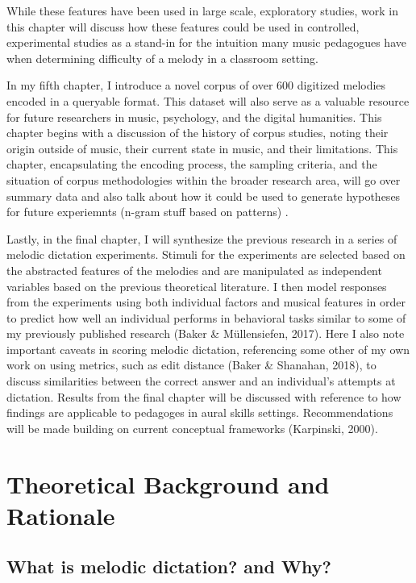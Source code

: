 \documentclass[]{book}
\theoremstyle{definition}
\theoremstyle{definition}
\theoremstyle{definition}
\theoremstyle{remark}
\begin{document}
While these features have been used in large scale, exploratory studies,
work in this chapter will discuss how these features could be used in
controlled, experimental studies as a stand-in for the intuition many
music pedagogues have when determining difficulty of a melody in a
classroom setting.

In my fifth chapter, I introduce a novel corpus of over 600 digitized
melodies encoded in a queryable format. This dataset will also serve as
a valuable resource for future researchers in music, psychology, and the
digital humanities. This chapter begins with a discussion of the history
of corpus studies, noting their origin outside of music, their current
state in music, and their limitations. This chapter, encapsulating the
encoding process, the sampling criteria, and the situation of corpus
methodologies within the broader research area, will go over summary
data and also talk about how it could be used to generate hypotheses for
future experiemnts (n-gram stuff based on patterns) .

Lastly, in the final chapter, I will synthesize the previous research in
a series of melodic dictation experiments. Stimuli for the experiments
are selected based on the abstracted features of the melodies and are
manipulated as independent variables based on the previous theoretical
literature. I then model responses from the experiments using both
individual factors and musical features in order to predict how well an
individual performs in behavioral tasks similar to some of my previously
published research (Baker \& Müllensiefen, 2017). Here I also note
important caveats in scoring melodic dictation, referencing some other
of my own work on using metrics, such as edit distance (Baker \&
Shanahan, 2018), to discuss similarities between the correct answer and
an individual's attempts at dictation. Results from the final chapter
will be discussed with reference to how findings are applicable to
pedagoges in aural skills settings. Recommendations will be made
building on current conceptual frameworks (Karpinski, 2000).

\hypertarget{intro}{%
\chapter{Theoretical Background and Rationale}\label{intro}}

\hypertarget{what-is-melodic-dictation-and-why}{%
\section{What is melodic dictation? and
Why?}\label{what-is-melodic-dictation-and-why}}
\end{document}
